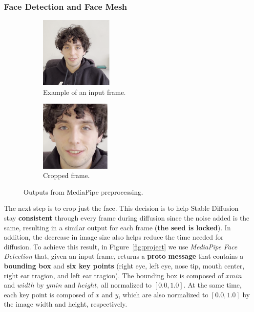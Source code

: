 \documentclass[sn-mathphys,Numbered]{sn-jnl}
\theoremstyle{thmstyleone}%
\theoremstyle{thmstyletwo}%
\theoremstyle{thmstylethree}%
\begin{document}
\subsubsection{Face Detection and Face Mesh}\label{sec:face_detection}




\begin{figure}[t]
	\centering
	\begin{subfigure}[b]{0.5\textwidth}
		\centering
		\includegraphics[width=3.6cm, keepaspectratio]{img/project_img/init.png}
		\caption{Example of an input frame.}\label{fig:init-frame}
	\end{subfigure}%
	\hfill
	\begin{subfigure}[b]{0.5\textwidth}
		\centering
		\includegraphics[width=3.5cm, keepaspectratio]{img/project_img/cropped.png}
		\caption{Cropped frame.}\label{fig:cropped}
	\end{subfigure}%
	\caption{Outputs from MediaPipe preprocessing.}\label{fig:project-mediapipe}
\end{figure}



The next step is to crop just the face.  This decision is to help Stable Diffusion stay \textbf{consistent} through every frame during diffusion since the noise added is the same,  resulting in a similar output for each frame (\textbf{the seed is locked}).  In addition, the decrease in image size also helps reduce the time needed for diffusion. 
To achieve this result, in Figure~\ref{fig:project} we use \emph{MediaPipe Face Detection} that, given an input frame,  returns a \textbf{proto message} that contains a \textbf{bounding box} and \textbf{six key points} (right eye, left eye, nose tip, mouth center, right ear tragion, and left ear tragion). 
The bounding box is composed of $xmin$ and $width$ by $ymin$ and $height$, all normalized to $[0.0, 1.0]$. 
At the same time, each key point is composed of $x$ and $y$, which are also normalized to $[0.0, 1.0]$ by the image width and height, respectively. 
\end{document}
